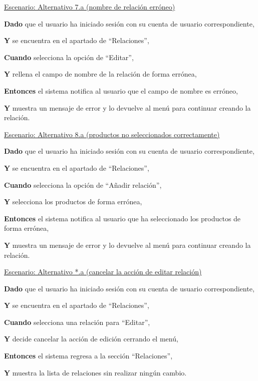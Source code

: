 \vspace{0.20cm}

\underline{Escenario: Alternativo 7.a (nombre de relación erróneo)}\par
\vspace{0.15cm}

\textbf{Dado} que el usuario ha iniciado sesión con su cuenta de usuario correspondiente,\par
\textbf{Y} se encuentra en el apartado de \enquote{Relaciones},\par
\textbf{Cuando} selecciona la opción de \enquote{Editar},\par
\textbf{Y} rellena el campo de nombre de la relación de forma errónea,\par
\textbf{Entonces} el sistema notifica al usuario que el campo de nombre es erróneo,\par
\textbf{Y} muestra un mensaje de error y lo devuelve al menú para continuar creando la relación.\par

\vspace{0.20cm}

\underline{Escenario: Alternativo 8.a (productos no seleccionados correctamente)}\par
\vspace{0.15cm}

\textbf{Dado} que el usuario ha iniciado sesión con su cuenta de usuario correspondiente,\par
\textbf{Y} se encuentra en el apartado de \enquote{Relaciones},\par
\textbf{Cuando} selecciona la opción de \enquote{Añadir relación},\par
\textbf{Y} selecciona los productos de forma errónea,\par
\textbf{Entonces} el sistema notifica al usuario que ha seleccionado los productos de forma errónea,\par
\textbf{Y} muestra un mensaje de error y lo devuelve al menú para continuar creando la relación.\par

\vspace{0.20cm}

\underline{Escenario: Alternativo *.a (cancelar la acción de editar relación)}\par
\vspace{0.15cm}
\textbf{Dado} que el usuario ha iniciado sesión con su cuenta de usuario correspondiente,\par
\textbf{Y} se encuentra en el apartado de \enquote{Relaciones},\par
\textbf{Cuando} selecciona una relación para \enquote{Editar},\par
\textbf{Y} decide cancelar la acción de edición cerrando el menú,\par
\textbf{Entonces} el sistema regresa a la sección \enquote{Relaciones},\par
\textbf{Y} muestra la lista de relaciones sin realizar ningún cambio.\par


